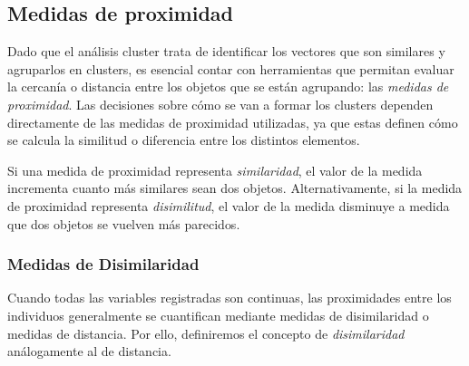 \subsection{Medidas de proximidad}


Dado que el análisis cluster trata de identificar los vectores que son similares y agruparlos en clusters, es esencial contar con herramientas que permitan evaluar la cercanía o 
distancia entre los objetos que se están agrupando: las \textit{medidas de proximidad}. Las decisiones sobre cómo se van a formar los clusters dependen directamente de las medidas de proximidad utilizadas, ya que estas 
definen cómo se calcula la similitud o diferencia entre los distintos elementos. \newline

Si una medida de proximidad representa \textit{similaridad}, el valor de la medida incrementa 
cuanto más similares sean dos objetos. Alternativamente, si la medida de proximidad representa \textit{disimilitud}, el valor de la medida disminuye a medida que dos objetos se vuelven más 
parecidos.

\subsubsection{Medidas de Disimilaridad}

Cuando todas las variables registradas son continuas, las proximidades entre los individuos generalmente se cuantifican mediante medidas de disimilaridad o medidas de distancia. 
Por ello, definiremos el concepto de \textit{disimilaridad} análogamente al de distancia.

